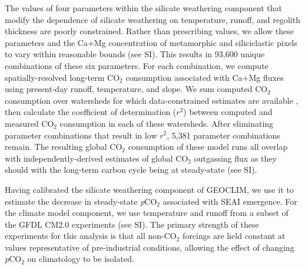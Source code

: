 \documentclass[9pt,twocolumn,twoside,lineno]{pnas-new}
\newcommand{\pCOtwo}{\textit{p}CO$_{2}$\xspace}
\newcommand{\COtwo}{CO$_{2}$\xspace}
\begin{document}
The values of four parameters within the silicate weathering component that modify the dependence of silicate weathering on temperature, runoff, and regolith thickness are poorly constrained. Rather than prescribing values, we allow these parameters and the Ca+Mg concentration of metamorphic and siliciclastic pixels to vary within reasonable bounds (see SI). This results in 93,600 unique combinations of these six parameters. For each combination, we compute spatially-resolved long-term \COtwo consumption associated with Ca+Mg fluxes using present-day runoff, temperature, and slope. We sum computed \COtwo consumption over watersheds for which data-constrained estimates are available \cite{Gaillardet1999a, Moquet2018a}, then calculate the coefficient of determination ($r^{2}$) between computed and measured \COtwo consumption in each of these watersheds. After eliminating parameter combinations that result in low $r^{2}$, 5,381 parameter combinations remain. The resulting global \COtwo consumption of these model runs all overlap with independently-derived estimates of global \COtwo outgassing flux as they should with the long-term carbon cycle being at steady-state (see SI).

Having calibrated the silicate weathering component of GEOCLIM, we use it to estimate the decrease in steady-state \pCOtwo associated with SEAI emergence. For the climate model component, we use temperature and runoff from a subset of the GFDL CM2.0 experiments \cite{Delworth2006b} (see SI). The primary strength of these experiments for this analysis is that all non-\COtwo forcings are held constant at values representative of pre-industrial conditions, allowing the effect of changing \pCOtwo on climatology to be isolated.
\end{document}
